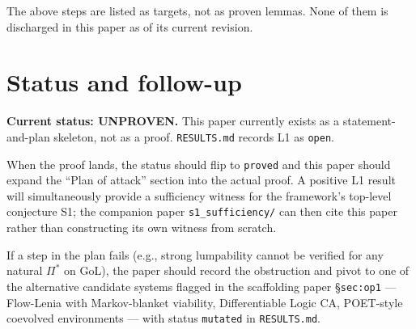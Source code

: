 \documentclass[11pt]{article}
\theoremstyle{plain}
\theoremstyle{definition}
\theoremstyle{remark}
\begin{document}
The above steps are listed as targets, not as proven lemmas. None of
them is discharged in this paper as of its current revision.

\section{Status and follow-up}

\textbf{Current status: UNPROVEN.} This paper currently exists as a
statement-and-plan skeleton, not as a proof. \texttt{RESULTS.md}
records L1 as \texttt{open}.

When the proof lands, the status should flip to \texttt{proved} and
this paper should expand the ``Plan of attack'' section into the
actual proof. A positive L1 result will simultaneously provide a
sufficiency witness for the framework's top-level conjecture S1; the
companion paper \texttt{s1\_sufficiency/} can then cite this paper
rather than constructing its own witness from scratch.

If a step in the plan fails (e.g., strong lumpability cannot be
verified for any natural $\Pi^*$ on GoL), the paper should record
the obstruction and pivot to one of the alternative candidate
systems flagged in the scaffolding paper §\texttt{sec:op1} ---
Flow-Lenia with Markov-blanket viability, Differentiable Logic CA,
POET-style coevolved environments --- with status
\texttt{mutated} in \texttt{RESULTS.md}.



\end{document}
